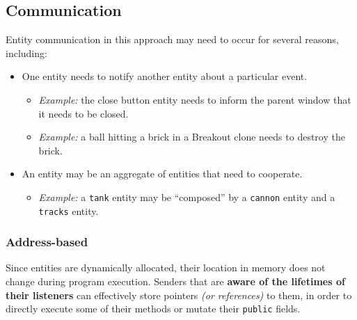 \documentclass[oneside, 12pt, a4paper, openany]{book}
\providecommand{\tightlist}{%
  \setlength{\itemsep}{0pt}\setlength{\parskip}{0pt}}
\begin{document}
\hypertarget{chapter_oop_communication}{\subsection{Communication}\label{chapter_oop_communication}}

Entity communication in this approach may need to occur for several
reasons, including:

\begin{itemize}
\item
  One entity needs to notify another entity about a particular event.

  \begin{itemize}
  \item
    \emph{Example:} the close button entity needs to inform the parent
    window that it needs to be closed.
  \item
    \emph{Example:} a ball hitting a brick in a Breakout clone needs to
    destroy the brick.
  \end{itemize}
\item
  An entity may be an aggregate of entities that need to cooperate.

  \begin{itemize}
  \tightlist
  \item
    \emph{Example:} a
    \texttt{tank}
    entity may be ``composed'' by a
    \texttt{cannon}
    entity and a
    \texttt{tracks}
    entity.
  \end{itemize}
\end{itemize}

\subsubsection{Address-based}\label{address-based}

Since entities are dynamically allocated, their location in memory does
not change during program execution. Senders that are \textbf{aware of
the lifetimes of their listeners} can effectively store pointers
\emph{(or references)} to them, in order to directly execute some of
their methods or mutate their
\texttt{public}
fields.
\end{document}
